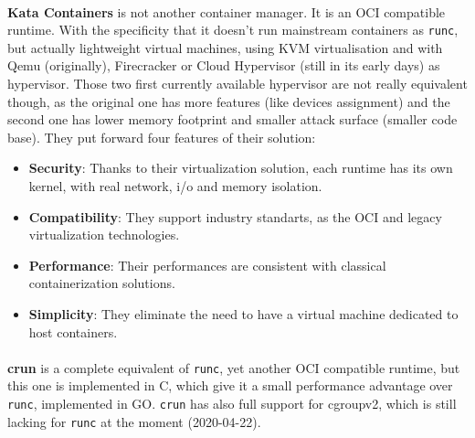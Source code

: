 \paragraph{}\textbf{Kata Containers} is not another container manager.  It is an OCI compatible runtime.  With the specificity that it doesn't run mainstream containers as \texttt{runc}, but actually lightweight virtual machines, using KVM virtualisation and with Qemu (originally), Firecracker or Cloud Hypervisor (still in its early days) as hypervisor.  Those two first currently available hypervisor are not really equivalent though, as the original one has more features (like devices assignment) and the second one has lower memory footprint and smaller attack surface (smaller code base).
They put forward four features of their solution:
\begin{itemize}
\renewcommand\labelitemi{--}
  \item \textbf{Security}: Thanks to their virtualization solution, each runtime has its own kernel, with real network, i/o and memory isolation.
  \item \textbf{Compatibility}:  They support industry standarts, as the OCI\cite{oci} and legacy virtualization technologies.
  \item \textbf{Performance}:  Their performances are consistent with classical containerization solutions.
  \item \textbf{Simplicity}:  They eliminate the need to have a virtual machine dedicated to host containers.
\end{itemize}

\paragraph{}\textbf{crun} is a complete equivalent of \texttt{runc}, yet another OCI compatible runtime, but this one is implemented in C, which give it a small performance advantage over \texttt{runc}, implemented in GO.  \texttt{crun} has also full support for cgroupv2, which is still lacking for \texttt{runc} at the moment (2020-04-22).
